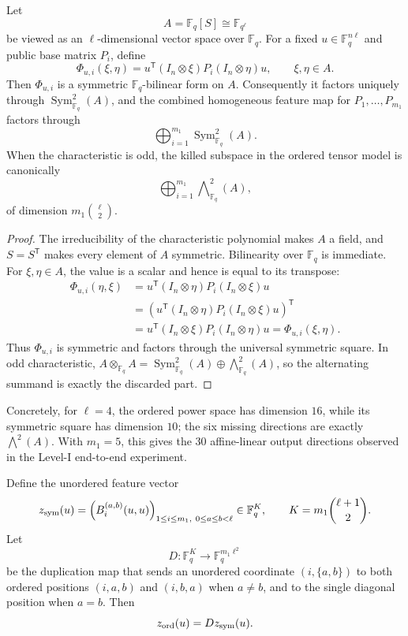\documentclass[runningheads]{llncs}
\newcommand{\F}{\mathbb F}
\newcommand{\Sym}{\operatorname{Sym}}
\newcommand{\transpose}{\mathsf T}
\begin{document}
\begin{theorem}\label{thm:structural-sym2}
Let
\[
 A=\F_q[S]\cong \F_{q^\ell}
\]
be viewed as an $\ell$-dimensional vector space over $\F_q$.  For a fixed
$u\in\F_q^{n\ell}$ and public base matrix $P_i$, define
\[
 \Phi_{u,i}(\xi,\eta)
 =u^\transpose(I_n\otimes\xi)P_i(I_n\otimes\eta)u,
 \qquad \xi,\eta\in A.
\]
Then $\Phi_{u,i}$ is a symmetric $\F_q$-bilinear form on $A$.  Consequently
it factors uniquely through $\Sym^2_{\F_q}(A)$, and the combined homogeneous
feature map for $P_1,\ldots,P_{m_1}$ factors through
\[
 \bigoplus_{i=1}^{m_1}\Sym^2_{\F_q}(A).
\]
When the characteristic is odd, the killed subspace in the ordered tensor
model is canonically
\[
 \bigoplus_{i=1}^{m_1}\bigwedge\nolimits^2_{\F_q}(A),
\]
of dimension $m_1\binom{\ell}{2}$.
\end{theorem}

\begin{proof}
The irreducibility of the characteristic polynomial makes $A$ a field, and
$S=S^\transpose$ makes every element of $A$ symmetric.  Bilinearity over
$\F_q$ is immediate.  For $\xi,\eta\in A$, the value is a scalar and hence
is equal to its transpose:
\[
\begin{aligned}
 \Phi_{u,i}(\eta,\xi)
 &=u^\transpose(I_n\otimes\eta)P_i(I_n\otimes\xi)u\\
 &=\left(u^\transpose(I_n\otimes\eta)P_i(I_n\otimes\xi)u\right)^\transpose\\
 &=u^\transpose(I_n\otimes\xi)P_i(I_n\otimes\eta)u
 =\Phi_{u,i}(\xi,\eta).
\end{aligned}
\]
Thus $\Phi_{u,i}$ is symmetric and factors through the universal symmetric
square.  In odd characteristic,
$A\otimes_{\F_q}A=\Sym^2_{\F_q}(A)\oplus\bigwedge^2_{\F_q}(A)$, so the
alternating summand is exactly the discarded part.
\end{proof}

Concretely, for $\ell=4$, the ordered power
space has dimension $16$, while its symmetric square has dimension $10$;
the six missing directions are exactly $\bigwedge^2(A)$.  With $m_1=5$,
this gives the 30 affine-linear output directions observed in the Level-I
end-to-end experiment.

Define the unordered feature vector
\[
 z_{\rm sym}(u)
 =\left(B_i^{(a,b)}(u,u)\right)_{1\le i\le m_1,\ 0\le a\le b<\ell}
 \in\F_q^K,
 \qquad K=m_1\binom{\ell+1}{2}.
\]
Let
\[
 D:\F_q^K\longrightarrow\F_q^{m_1\ell^2}
\]
be the duplication map that sends an unordered coordinate $(i,\{a,b\})$ to both ordered positions $(i,a,b)$ and $(i,b,a)$ when $a\ne b$, and to the single diagonal position when $a=b$.  Then
\begin{equation}\label{eq:dup}
 z_{\rm ord}(u)=Dz_{\rm sym}(u).
\end{equation}
\end{document}
